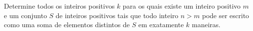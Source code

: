 Determine todos os inteiros positivos $k$ para os quais existe um inteiro positivo $m$ e um conjunto $S$ de inteiros positivos tais que todo inteiro $n > m$ pode ser escrito como uma soma de elementos distintos de $S$ em exatamente $k$ maneiras.
